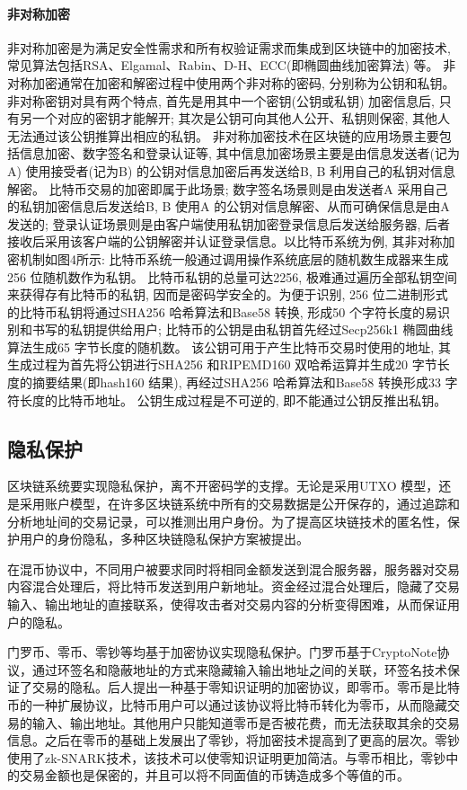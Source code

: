 \documentclass[UTF8,a4paper,10pt, twocolumn]{ctexart}
\begin{document}
\paragraph{非对称加密}
非对称加密是为满足安全性需求和所有权验证需求而集成到区块链中的加密技术,常见算法包括RSA、Elgamal、Rabin、D-H、ECC(即椭圆曲线加密算法) 等。 非对称加密通常在加密和解密过程中使用两个非对称的密码, 分别称为公钥和私钥。 非对称密钥对具有两个特点, 首先是用其中一个密钥(公钥或私钥) 加密信息后, 只有另一个对应的密钥才能解开; 其次是公钥可向其他人公开、私钥则保密, 其他人无法通过该公钥推算出相应的私钥。 非对称加密技术在区块链的应用场景主要包括信息加密、数字签名和登录认证等, 其中信息加密场景主要是由信息发送者(记为A) 使用接受者(记为B) 的公钥对信息加密后再发送给B, B 利用自己的私钥对信息解密。 比特币交易的加密即属于此场景; 数字签名场景则是由发送者A 采用自己的私钥加密信息后发送给B, B 使用A 的公钥对信息解密、从而可确保信息是由A 发送的; 登录认证场景则是由客户端使用私钥加密登录信息后发送给服务器, 后者接收后采用该客户端的公钥解密并认证登录信息。以比特币系统为例, 其非对称加密机制如图4所示: 比特币系统一般通过调用操作系统底层的随机数生成器来生成256 位随机数作为私钥。 比特币私钥的总量可达2256, 极难通过遍历全部私钥空间来获得存有比特币的私钥, 因而是密码学安全的。为便于识别, 256 位二进制形式的比特币私钥将通过SHA256 哈希算法和Base58 转换, 形成50 个字符长度的易识别和书写的私钥提供给用户; 比特币的公钥是由私钥首先经过Secp256k1 椭圆曲线算法生成65 字节长度的随机数。 该公钥可用于产生比特币交易时使用的地址, 其生成过程为首先将公钥进行SHA256 和RIPEMD160 双哈希运算并生成20 字节长度的摘要结果(即hash160 结果), 再经过SHA256 哈希算法和Base58 转换形成33 字符长度的比特币地址。 公钥生成过程是不可逆的, 即不能通过公钥反推出私钥。 
\subsection{隐私保护}
区块链系统要实现隐私保护，离不开密码学的支撑。无论是采用UTXO 模型，还是采用账户模型，在许多区块链系统中所有的交易数据是公开保存的，通过追踪和分析地址间的交易记录，可以推测出用户身份。为了提高区块链技术的匿名性，保护用户的身份隐私，多种区块链隐私保护方案被提出。

在混币协议中，不同用户被要求同时将相同金额发送到混合服务器，服务器对交易内容混合处理后，将比特币发送到用户新地址。资金经过混合处理后，隐藏了交易输入、输出地址的直接联系，使得攻击者对交易内容的分析变得困难，从而保证用户的隐私。

门罗币、零币、零钞等均基于加密协议实现隐私保护。门罗币基于CryptoNote协议，通过环签名和隐蔽地址的方式来隐藏输入输出地址之间的关联，环签名技术保证了交易的隐私。后人提出一种基于零知识证明的加密协议，即零币。零币是比特币的一种扩展协议，比特币用户可以通过该协议将比特币转化为零币，从而隐藏交易的输入、输出地址。其他用户只能知道零币是否被花费，而无法获取其余的交易信息。之后在零币的基础上发展出了零钞，将加密技术提高到了更高的层次。零钞使用了zk-SNARK技术，该技术可以使零知识证明更加简洁。与零币相比，零钞中的交易金额也是保密的，并且可以将不同面值的币铸造成多个等值的币。
\end{document}
